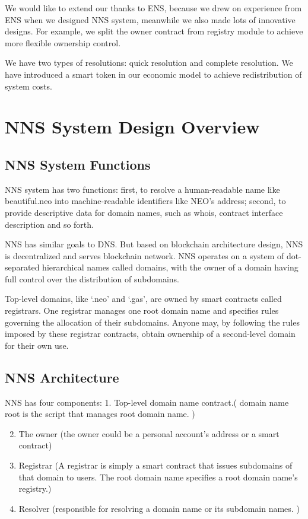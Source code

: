 \documentclass[letterpaper,10pt,english]{sphinxmanual}
\begin{document}
We would like to extend our thanks to ENS, because we drew on experience from ENS when we designed NNS system,
meanwhile we also made lots of innovative designs. For example, we split the owner contract from registry module to achieve more flexible ownership control.

We have two types of resolutions: quick resolution and complete resolution.
We have introduced a smart token in our economic model to achieve redistribution of system costs.


\chapter{NNS System Design Overview}
\label{\detokenize{nns_system:nns-system-design-overview}}\label{\detokenize{nns_system::doc}}

\section{NNS System Functions}
\label{\detokenize{nns_system:nns-system-functions}}
NNS system has two functions: first, to resolve a human-readable name like beautiful.neo
into machine-readable identifiers like NEO’s address; second, to provide descriptive data for domain names,
such as whois, contract interface description and so forth.

NNS has similar goals to DNS. But based on blockchain architecture design,
NNS is decentralized and serves blockchain network. NNS operates on a system of dot-separated hierarchical names called domains,
with the owner of a domain having full control over the distribution of subdomains.

Top-level domains, like ‘.neo’ and ‘.gas’, are owned by smart contracts called registrars.
One registrar manages one root domain name and specifies rules governing the allocation of their subdomains.
Anyone may, by following the rules imposed by these registrar contracts, obtain ownership of a second-level domain for their own use.


\section{NNS Architecture}
\label{\detokenize{nns_system:nns-architecture}}
NNS has four components:
1. Top-level domain name contract.( domain name root is the script that manages root domain name. )
\begin{enumerate}
\setcounter{enumi}{1}
\item {} 
The owner (the owner could be a personal account’s address or a smart contract)

\item {} 
Registrar (A registrar is simply a smart contract that issues subdomains of that domain to users. The root domain name specifies a root domain name’s registry.)

\item {} 
Resolver (responsible for resolving a domain name or its subdomain names. )

\end{enumerate}
\end{document}
